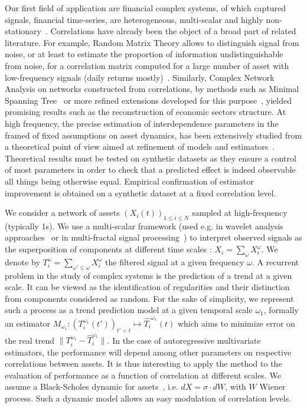\documentclass{bmcart}
\newcommand{\norm}[1]{\| #1 \|}
\begin{document}
Our first field of application are financial complex systems, of which captured signals, financial time-series, are heterogeneous, multi-scalar and highly non-stationary~\cite{mantegna2000introduction}. Correlations have already been the object of a broad part of related literature. For example, Random Matrix Theory allows to distinguish signal from noise, or at least to estimate the proportion of information undistinguishable from noise, for a correlation matrix computed for a large number of asset with low-frequency signals (daily returns mostly)~\cite{2009arXiv0910.1205B}. Similarly, Complex Network Analysis on networks constructed from correlations, by methods such as Minimal Spanning Tree~\cite{2001PhyA..299...16B} or more refined extensions developed for this purpose~\cite{tumminello2005tool}, yielded promising results such as the reconstruction of economic sectors structure. At high frequency, the precise estimation of interdependence parameters in the framed of fixed assumptions on asset dynamics, has been extensively studied from a theoretical point of view aimed at refinement of models and estimators~\cite{barndorff2011multivariate}. Theoretical results must be tested on synthetic datasets as they ensure a control of most parameters in order to check that a predicted effect is indeed observable all things being otherwise equal. Empirical confirmation of estimator improvement is obtained on a synthetic dataset at a fixed correlation level.


We consider a network of assets $(X_i(t))_{1\leq i \leq N}$ sampled at high-frequency (typically 1s). We use a multi-scalar framework (used e.g. in wavelet analysis approaches~\cite{ramsey2002wavelets} or in multi-fractal signal processing~\cite{bouchaud2000apparent}) to interpret observed signals as the superposition of components at different time scales : $X_i=\sum_{\omega}{X_i^{\omega}}$. We denote by $T_i^{\omega} = \sum_{\omega' \leq \omega} X_i^{\omega}$ the filtered signal at a given frequency $\omega$. A recurrent problem in the study of complex systems is the prediction of a trend at a given scale. It can be viewed as the identification of regularities and their distinction from components considered as random. For the sake of simplicity, we represent such a process as a trend prediction model at a given temporal scale $\omega_1$, formally an estimator $M_{\omega_1} : (T_i^{\omega_1}(t'))_{t'<t} \mapsto \hat{T_i}^{\omega_1}(t)$ which aims to minimize error on the real trend $\norm{T_i^{\omega_1} - \hat{T}_i^{\omega_1}}$. In the case of autoregressive multivariate estimators, the performance will depend among other parameters on respective correlations between assets. It is thus interesting to apply the method to the evaluation of performance as a function of correlation at different scales. We assume a Black-Scholes dynamic for assets~\cite{jarrow1999honor}, i.e. $dX = \sigma\cdot dW$, with $W$ Wiener process. Such a dynamic model allows an easy modulation of correlation levels.
\end{document}
